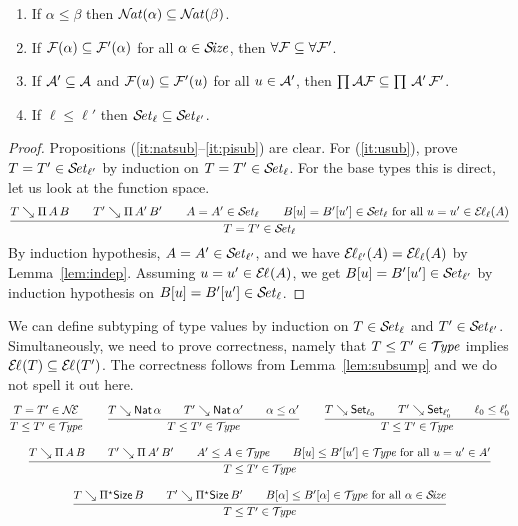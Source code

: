 \documentclass[acmlarge,review,anonymous]{acmart}\settopmatter{printfolios=true}
\begin{document}
\begin{lemma}[Subsumption]
\label{lem:subsump} \hfill
\begin{enumerate}
\item \label{it:natsub} If\/ $\alpha \leq \beta$ then $\NAT(\alpha) \subseteq \NAT(\beta)$.
\item \label{it:allsub} If\/ $\F(\alpha) \subseteq \F'(\alpha)$ for all $\alpha \in \SIZE$, then $\FORALL \F \subseteq \FORALL \F'$.
\item \label{it:pisub}  If\/ $\A' \subseteq \A$ and $\F(u) \subseteq \F'(u)$ for all $u \in \A'$, then $\PIAF \subseteq \PI\,\A'\,\F'$.
\item \label{it:usub}  If\/ $\ell \leq \ell'$ then $\SET[\ell] \subseteq \SET[\ell']$.
\end{enumerate}
\end{lemma}
\begin{proof}
  Propositions (\ref{it:natsub}--\ref{it:pisub}) are clear.
  For (\ref{it:usub}), prove $T = T' \in \SET[\ell']$ by induction on $T = T' \in \SET[\ell]$.
  For the base types this is direct, let us look at the function space.
\[
  \rul{T \evalsto \piT A B \qquad
      T' \evalsto \piT{A'}{B'} \qquad
      A = A' \in \SET[\ell] \qquad
      B[u] = B'[u'] \in \SET[\ell] \mforall u = u' \in \EL[\ell](A)
    }{T = T' \in \SET[\ell]}
\]
  By induction hypothesis, $A = A' \in \SET[\ell']$, and we have $\EL[\ell'](A) = \EL[\ell](A)$ by Lemma~\ref{lem:indep}.  Assuming $u = u' \in \EL(A)$, we get $B[u] = B'[u'] \in \SET[\ell']$ by induction hypothesis on $B[u] = B'[u'] \in \SET[\ell]$.
\end{proof}
We can define subtyping of type values  by induction on $T \in \SET[\ell]$ and $T' \in \SET[\ell']$.
Simultaneously, we need to prove correctness, namely that $T \leq T' \in \TYPE$ implies $\EL(T) \subseteq \EL(T')$.  The correctness follows from Lemma~\ref{lem:subsump} and we do not spell it out here.
\begin{gather*}
  \ru{T = T' \in \NEE
    }{T \leq T' \in \TYPE}
\qquad
  \ru{T \evalsto \Nat \alpha \qquad
      T' \evalsto \Nat \alpha' \qquad
      \alpha \leq \alpha'
    }{T \leq T' \in \TYPE}
\qquad
  \ru{T \evalsto \Set[\ell_0] \qquad
      T' \evalsto \Set[\ell_0'] \qquad
      \ell_0 \leq \ell_0'
    }{T \leq T' \in \TYPE}
\\[2ex]
  \ru{T \evalsto \piT A B \qquad
      T' \evalsto \piT {A'}{B'} \qquad
      A' \leq A \in \TYPE \qquad
      B[u] \leq B'[u'] \in \TYPE \mforall u = u' \in A'
    }{T \leq T' \in \TYPE}
\\[2ex]
  \ru{T \evalsto \epiT \Size B \qquad
      T' \evalsto \epiT {\Size}{B'} \qquad
      B[\alpha] \leq B'[\alpha] \in \TYPE \mforall \alpha \in \SIZE
    }{T \leq T' \in \TYPE}
\end{gather*}
\end{document}
